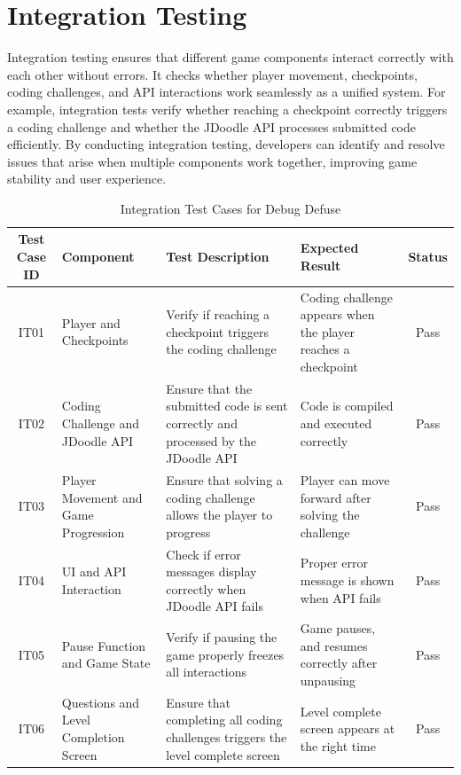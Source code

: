 \newpage
\section{Integration Testing}
Integration testing ensures that different game components interact correctly with each other without errors. It checks whether player movement, checkpoints, coding challenges, and API interactions work seamlessly as a unified system. For example, integration tests verify whether reaching a checkpoint correctly triggers a coding challenge and whether the JDoodle API processes submitted code efficiently. By conducting integration testing, developers can identify and resolve issues that arise when multiple components work together, improving game stability and user experience.
\FloatBarrier %
\vspace{-10pt} %
\begin{table}[H]
    \centering
    \renewcommand{\arraystretch}{1.3}
    \small
    \begin{tabular}{|c|p{3cm}|p{3cm}|p{3cm}|c|}
        \hline
        \textbf{Test Case ID} & \textbf{Component} & \textbf{Test Description} & \textbf{Expected Result} & \textbf{Status} \\
        \hline
        IT01 & Player and Checkpoints & Verify if reaching a checkpoint triggers the coding challenge & Coding challenge appears when the player reaches a checkpoint & Pass \\
        \hline
        IT02 & Coding Challenge and JDoodle API & Ensure that the submitted code is sent correctly and processed by the JDoodle API & Code is compiled and executed correctly & Pass \\
        \hline
        IT03 & Player Movement and Game Progression & Ensure that solving a coding challenge allows the player to progress & Player can move forward after solving the challenge & Pass \\
        \hline
        IT04 & UI and API Interaction & Check if error messages display correctly when JDoodle API fails & Proper error message is shown when API fails & Pass \\
        \hline
        IT05 & Pause Function and Game State & Verify if pausing the game properly freezes all interactions & Game pauses, and resumes correctly after unpausing & Pass \\
        \hline
        IT06 &  Questions and Level Completion  Screen & Ensure that completing all coding challenges triggers the level complete screen & Level complete screen appears at the right time & Pass \\
        \hline
    \end{tabular}
    \caption{Integration Test Cases for Debug Defuse}
    \label{tab:integration_tests}
\end{table}
\newpage
